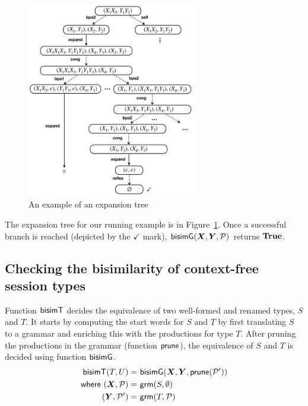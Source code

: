 \begin{figure}[t]
  \centering
  \includegraphics[width=7.5cm]{img/expansion_tree_example.png}  
  \caption{An example of an expansion tree}
  \label{fig:expansion-tree}
\end{figure}

\begin{example}
  The expansion tree for our running example is in
  Figure~\ref{fig:expansion-tree}. Once a successful branch is reached
  (depicted by the $\checkmark$ mark),
  $\Bisim(\vec X, \vec Y, \productions)$ returns $\mathbf{True}$.
\end{example}

\subsection{Checking the bisimilarity of context-free session types}

Function $\mathsf{bisimT}$ decides the equivalence of two well-formed and
renamed types, $S$ and $T$.  It starts by computing the start words
for $S$ and $T$ by first translating $S$ to a grammar and enriching
this with the productions for type $T$. After pruning the productions
in the grammar (function $\mathsf{prune}$), the equivalence of $S$ and
$T$ is decided using function $\mathsf{bisimG}$.
%
\begin{align*}
  \BisimT(T, U) =&\ \Bisim(\vec X, \vec Y, \Prune (\productions'))
  \\
  \mathsf{where}\ (\vec X, \productions) =&\ \grm (S, \emptyset)
  \\
  (\vec Y, \productions') =&\ \grm (T, \productions)
\end{align*}

